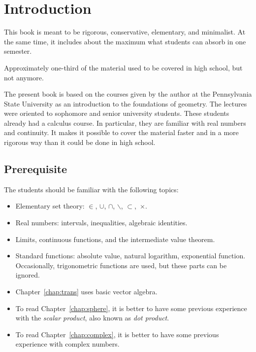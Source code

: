 \chapter*{Introduction}

This book is meant to be 
rigorous, 
conservative, 
elementary, 
and minimalist.
At the same time, it includes about the maximum what students can absorb in one semester.

Approximately one-third of the material used to be covered in high school, but not anymore.

The present book is based 
on the courses given by the author 
at the Pennsylvania State University
as an introduction to the foundations of geometry.
The lectures were oriented to sophomore and senior university students.  
These students already had a calculus course.
In particular, they are familiar with real numbers and continuity.
It makes it possible to cover the material faster 
and  in a more rigorous way
than it could be done in high school.

\section*{Prerequisite}

The students should be familiar 
with the following topics:
\begin{itemize}
\item Elementary set theory: 
$\in$,
$\cup$, 
$\cap$,
$\backslash$,
$\subset$,~$\times$.
\item Real numbers: intervals, inequalities, algebraic identities.
\item Limits, continuous functions, and the intermediate value theorem.
\item Standard functions: 
absolute value, 
natural logarithm,
exponential function. 
Occasionally, trigonometric functions  are used, 
but these parts can be ignored.
\item  Chapter~\ref{chap:trans} uses basic vector algebra.
\item To read Chapter~\ref{chap:sphere}, it is better to have some previous experience with the {}\emph{scalar product}, also known as {}\emph{dot product}.
\item To read Chapter~\ref{chap:complex}, it is better to have some previous experience with complex numbers.
\end{itemize} 

